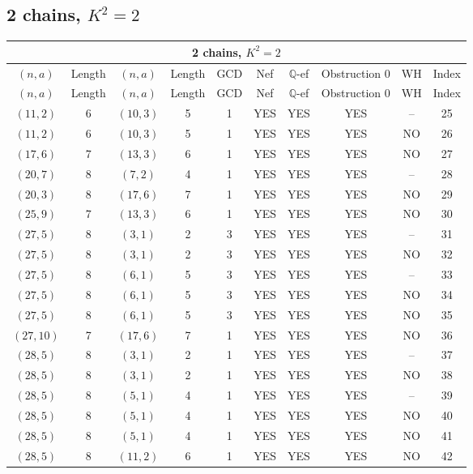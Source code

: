 \subsection{2 chains, $K^2 = 2$}
\begin{longtable}{|c|c|c|c|c|c|c|c|c|c|}
\hline
\multicolumn{10}{|c|}{2 chains, $K^2 = 2$}\\
\hline
$(n,a)$ & Length & $(n,a)$ & Length & GCD & Nef & $\mathbb Q$-ef & Obstruction 0 & WH & Index\\
\hline
\endfirsthead

\hline
$(n,a)$ & Length & $(n,a)$ & Length & GCD & Nef & $\mathbb Q$-ef & Obstruction 0 & WH & Index\\
\hline
\endhead
\hline
\endfoot

$(11, 2)$ & 6 & $(10, 3)$ & 5 & 1 & YES & YES & YES & -- & 25\\
$(11, 2)$ & 6 & $(10, 3)$ & 5 & 1 & YES & YES & YES & NO & 26\\
$(17, 6)$ & 7 & $(13, 3)$ & 6 & 1 & YES & YES & YES & NO & 27\\
$(20, 7)$ & 8 & $(7, 2)$ & 4 & 1 & YES & YES & YES & -- & 28\\
$(20, 3)$ & 8 & $(17, 6)$ & 7 & 1 & YES & YES & YES & NO & 29\\
$(25, 9)$ & 7 & $(13, 3)$ & 6 & 1 & YES & YES & YES & NO & 30\\
$(27, 5)$ & 8 & $(3, 1)$ & 2 & 3 & YES & YES & YES & -- & 31\\
$(27, 5)$ & 8 & $(3, 1)$ & 2 & 3 & YES & YES & YES & NO & 32\\
$(27, 5)$ & 8 & $(6, 1)$ & 5 & 3 & YES & YES & YES & -- & 33\\
$(27, 5)$ & 8 & $(6, 1)$ & 5 & 3 & YES & YES & YES & NO & 34\\
$(27, 5)$ & 8 & $(6, 1)$ & 5 & 3 & YES & YES & YES & NO & 35\\
$(27, 10)$ & 7 & $(17, 6)$ & 7 & 1 & YES & YES & YES & NO & 36\\
$(28, 5)$ & 8 & $(3, 1)$ & 2 & 1 & YES & YES & YES & -- & 37\\
$(28, 5)$ & 8 & $(3, 1)$ & 2 & 1 & YES & YES & YES & NO & 38\\
$(28, 5)$ & 8 & $(5, 1)$ & 4 & 1 & YES & YES & YES & -- & 39\\
$(28, 5)$ & 8 & $(5, 1)$ & 4 & 1 & YES & YES & YES & NO & 40\\
$(28, 5)$ & 8 & $(5, 1)$ & 4 & 1 & YES & YES & YES & NO & 41\\
$(28, 5)$ & 8 & $(11, 2)$ & 6 & 1 & YES & YES & YES & NO & 42\\

\end{longtable}
